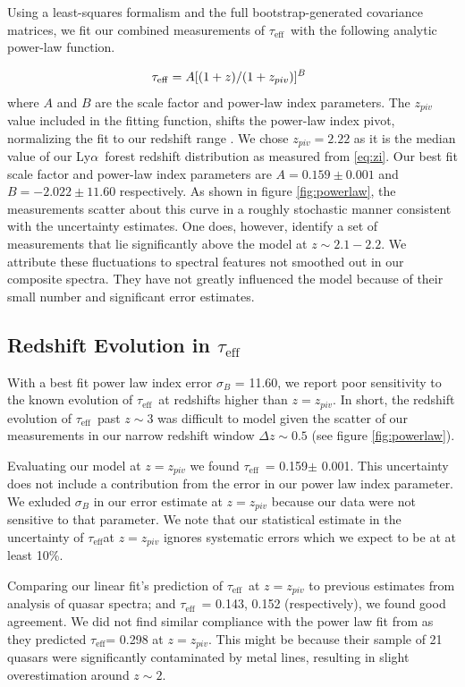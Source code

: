 \documentclass[twocolumn,tight,times]{aastex63}
\newcommand{\mteff}{\tau_\mathrm{eff}}
\newcommand{\teff}{$\mteff$}
\newcommand{\lya}{Ly$\alpha$}
\newcommand{\Aval}{0.159}  %
\newcommand{\Aerr}{0.001}  %
\newcommand{\Bval}{-2.022}  %
\newcommand{\Berr}{11.60}  %
\begin{document}
Using a least-squares formalism and the full bootstrap-generated covariance matrices, we fit our combined measurements of \teff\ with the following analytic power-law function.

\begin{equation}
        \tau_{\rm eff} = A[(1+z)/(1+z_{piv})]^{B}  \;\;
        \label{eq:powerlaw}
\end{equation}
where $A$ and $B$ are the scale factor and power-law index parameters. The $z_{piv}$ value included in the fitting function, shifts the power-law index pivot, normalizing the fit to our redshift range \citep{Becker_2013}. We chose $z_{piv} = 2.22$ as it is the median value of our \lya\ forest redshift distribution as measured from \ref{eq:zi}. Our best fit scale factor and power-law index parameters are $A = \Aval \pm \Aerr$ and $B = \Bval \pm \Berr$ respectively. As shown in figure \ref{fig:powerlaw}, the measurements scatter about this curve in a roughly stochastic manner consistent with the uncertainty estimates. One does, however, identify a set of measurements that lie significantly above the model at $z \sim 2.1-2.2$. We attribute these fluctuations to spectral features not smoothed out in our composite spectra. They have not greatly influenced the model because of their small number and significant error estimates.

\subsection{Redshift Evolution in \teff}
\label{subsec:literature}

With a best fit power law index error $\sigma_{B}$ = \Berr, we report poor sensitivity to the known evolution of \teff\ at redshifts higher than $z = z_{piv}$. In short, the redshift evolution of \teff\ past $z \sim 3$ was difficult to model given the scatter of our measurements in our narrow redshift window $\Delta z \sim 0.5$ (see figure \ref{fig:powerlaw}).

Evaluating our model at $z = z_{piv}$ we found \teff\ = \Aval $\pm$ \Aerr. This uncertainty does not include a contribution from the error in our power law index parameter. We exluded $\sigma_{B}$ in our error estimate at $z = z_{piv}$ because our data were not sensitive to that parameter. We note that our statistical estimate in the uncertainty of \teff at $z = z_{piv}$ ignores systematic errors which we expect to be at at least 10\%.

Comparing our linear fit's prediction of \teff\ at $z = z_{piv}$ to previous estimates from analysis of quasar spectra; \cite{Kirkman_2005} and \cite{Becker_2013} \teff\ = 0.143, 0.152 (respectively), we found good agreement. We did not find similar compliance with the power law fit from \cite{Schaye_2003} as they predicted \teff = 0.298 at $z = z_{piv}$. This might be because their sample of 21 quasars were significantly contaminated by metal lines, resulting in slight overestimation around $z \sim 2$.
\end{document}
